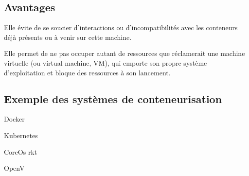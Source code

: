 \subsection{Avantages}
\begin{list}{•}
	\item Elle évite de se soucier d’interactions ou d’incompatibilités avec les conteneurs déjà présents ou à
	venir sur cette machine.
	\item 
	\item Elle permet de ne pas occuper autant de ressources que réclamerait une machine virtuelle (ou virtual machine, VM), qui emporte son propre système d’exploitation et bloque des ressources à son
	lancement.
\end{list}
\subsection{Exemple des systèmes de conteneurisation}
\begin{list}{•}
	\item Docker
	\item Kubernetes
	\item CoreOs rkt
	\item OpenV
\end{list}
